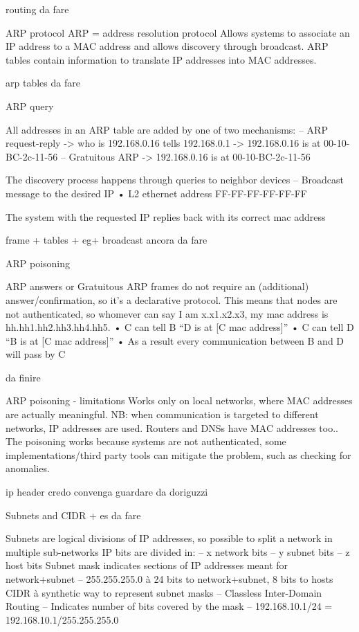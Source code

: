 routing da fare 

ARP protocol
ARP = address resolution protocol
Allows systems to associate an IP address to a MAC address and allows discovery through broadcast. ARP tables contain information to translate IP addresses into MAC addresses.

arp tables da fare 

ARP query

All addresses in an ARP table are added by one of two mechanisms:
– ARP request-reply
-> who is 192.168.0.16 tells 192.168.0.1
-> 192.168.0.16 is at 00-10-BC-2c-11-56
– Gratuitous ARP
-> 192.168.0.16 is at 00-10-BC-2c-11-56

The discovery process happens through queries to neighbor devices
– Broadcast message to the desired IP
• L2 ethernet address FF-FF-FF-FF-FF-FF

The system with the requested IP replies back with its correct mac address


frame + tables + eg+ broadcast ancora da fare 

ARP poisoning

ARP answers or Gratuitous ARP frames do not require an (additional) answer/confirmation, so it’s a declarative protocol. This means that nodes are not authenticated, so whomever can say I am x.x1.x2.x3, my mac address is hh.hh1.hh2.hh3.hh4.hh5.
• C can tell B “D is at [C mac address]”
• C can tell D “B is at [C mac address]”
• As a result every communication between B and D will pass by C

da finire

ARP poisoning - limitations
Works only on local networks, where MAC addresses are actually meaningful. 
NB: when communication is targeted to different networks, IP addresses are used.
Routers and DNSs have MAC addresses too..
The poisoning works because systems are not authenticated, some implementations/third party tools can mitigate the problem, such as checking for anomalies.

ip header credo convenga guardare da doriguzzi


Subnets and CIDR + es da fare 

Subnets are logical divisions of IP addresses, so possible to split a network in multiple sub-networks
IP bits are divided in:
– x network bits
– y subnet bits
– z host bits
Subnet mask indicates sections of IP addresses meant for network+subnet
– 255.255.255.0 à 24 bits to network+subnet, 8 bits to hosts
CIDR à synthetic way to represent subnet masks
– Classless Inter-Domain Routing
– Indicates number of bits covered by the mask
– 192.168.10.1/24 = 192.168.10.1/255.255.255.0
